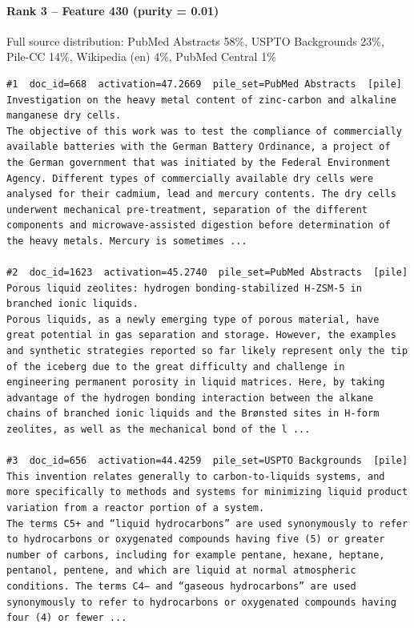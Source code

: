 \paragraph*{Rank 3 -- Feature 430 (purity = 0.01)}

Full source distribution: PubMed Abstracts 58\%, USPTO Backgrounds 23\%, Pile-CC 14\%, Wikipedia (en) 4\%, PubMed Central 1\%

\begin{verbatim}
#1  doc_id=668  activation=47.2669  pile_set=PubMed Abstracts  [pile]
Investigation on the heavy metal content of zinc-carbon and alkaline manganese dry cells.
The objective of this work was to test the compliance of commercially available batteries with the German Battery Ordinance, a project of the German government that was initiated by the Federal Environment Agency. Different types of commercially available dry cells were analysed for their cadmium, lead and mercury contents. The dry cells underwent mechanical pre-treatment, separation of the different components and microwave-assisted digestion before determination of the heavy metals. Mercury is sometimes ...

#2  doc_id=1623  activation=45.2740  pile_set=PubMed Abstracts  [pile]
Porous liquid zeolites: hydrogen bonding-stabilized H-ZSM-5 in branched ionic liquids.
Porous liquids, as a newly emerging type of porous material, have great potential in gas separation and storage. However, the examples and synthetic strategies reported so far likely represent only the tip of the iceberg due to the great difficulty and challenge in engineering permanent porosity in liquid matrices. Here, by taking advantage of the hydrogen bonding interaction between the alkane chains of branched ionic liquids and the Brønsted sites in H-form zeolites, as well as the mechanical bond of the l ...

#3  doc_id=656  activation=44.4259  pile_set=USPTO Backgrounds  [pile]
This invention relates generally to carbon-to-liquids systems, and more specifically to methods and systems for minimizing liquid product variation from a reactor portion of a system.
The terms C5+ and “liquid hydrocarbons” are used synonymously to refer to hydrocarbons or oxygenated compounds having five (5) or greater number of carbons, including for example pentane, hexane, heptane, pentanol, pentene, and which are liquid at normal atmospheric conditions. The terms C4− and “gaseous hydrocarbons” are used synonymously to refer to hydrocarbons or oxygenated compounds having four (4) or fewer ...


\end{verbatim}
